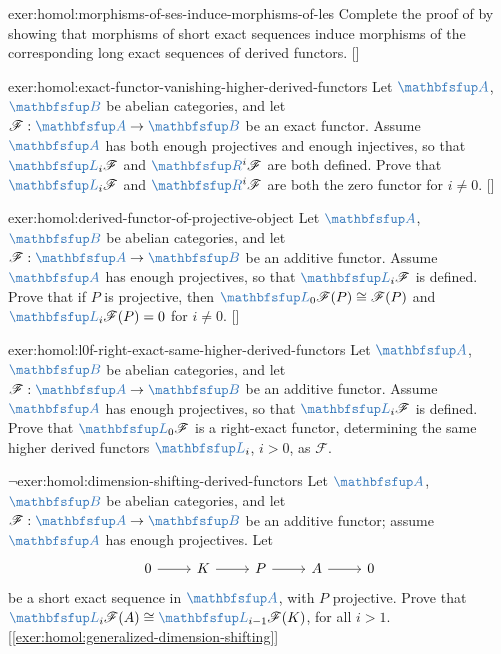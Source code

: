\begin{exer}{\exerused{}}{exer:homol:morphisms-of-ses-induce-morphisms-of-les}
  Complete the proof of  by showing that
  morphisms of short exact sequences induce morphisms of the
  corresponding long exact sequences of derived
  functors. []
\end{exer}
\begin{exer}{\exerused{}}{exer:homol:exact-functor-vanishing-higher-derived-functors}
  Let $\categ{A}$, $\categ{B}$ be abelian categories, and let
  $\mathscr{F} : \categ{A} \to \categ{B}$ be an exact functor.  Assume
  $\categ{A}$ has both enough projectives and enough injectives, so
  that $\categ{L}_i\mathscr{F}$ and $\categ{R}^i\mathscr{F}$ are both
  defined. Prove that $\categ{L}_i\mathscr{F}$ and
  $\categ{R}^i\mathscr{F}$ are both the zero functor for $i \ne
  0$. []
\end{exer}
\begin{exer}{\exerused{}}{exer:homol:derived-functor-of-projective-object}
  Let $\categ{A}$, $\categ{B}$ be abelian categories, and let
  $\mathscr{F} : \categ{A} \to \categ{B}$ be an additive functor.
  Assume $\categ{A}$ has enough projectives, so that
  $\categ{L}_i\mathscr{F}$ is defined. Prove that if $P$ is
  projective, then $\categ{L}_0\mathscr{F}(P) \cong \mathscr{F}(P)$
  and $\categ{L}_i\mathscr{F}(P) = 0$ for $i \ne
  0$. []
\end{exer}
\begin{exer}{}{exer:homol:l0f-right-exact-same-higher-derived-functors}
  Let $\categ{A}$, $\categ{B}$ be abelian categories, and let
  $\mathscr{F} : \categ{A} \to \categ{B}$ be an additive functor.
  Assume $\categ{A}$ has enough projectives, so that
  $\categ{L}_i\mathscr{F}$ is defined. Prove that
  $\categ{L}_0\mathscr{F}$ is a right-exact functor, determining the
  same higher derived functors $\categ{L}_i$, $i > 0$, as
  $\mathscr{F}$.
\end{exer}
\begin{exer}{$\lnot$}{exer:homol:dimension-shifting-derived-functors}
  Let $\categ{A}$, $\categ{B}$ be abelian categories, and let
  $\mathscr{F} : \categ{A} \to \categ{B}$ be an additive functor;
  assume $\categ{A}$ has enough projectives. Let
  \[\begin{tikzcd}
      0 \arrow[r] & K \arrow[r] & P \arrow[r] & A \arrow[r] & 0
    \end{tikzcd}\] be a short exact sequence in $\categ{A}$, with $P$
  projective.  Prove that
  $\categ{L}_i\mathscr{F}(A) \cong \categ{L}_{i-1}\mathscr{F}(K)$, for
  all $i > 1$. [\ref{exer:homol:generalized-dimension-shifting}]
\end{exer}
